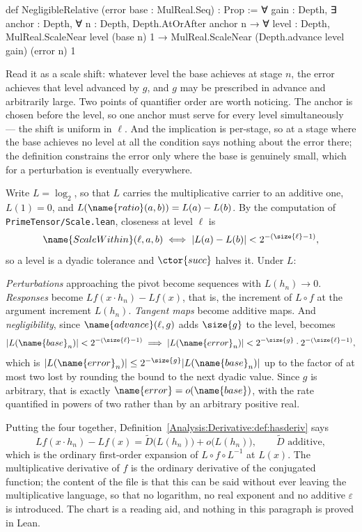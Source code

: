 \begin{leancode}
def NegligibleRelative (error base : MulReal.Seq) : Prop :=
  ∀ gain : Depth,
    ∃ anchor : Depth,
      ∀ n : Depth,
        Depth.AtOrAfter anchor n →
        ∀ level : Depth,
          MulReal.ScaleNear level (base n) 1 →
          MulReal.ScaleNear (Depth.advance level gain) (error n) 1
\end{leancode}

Read it as a scale shift: whatever level the base achieves at stage $n$, the
error achieves that level advanced by $g$, and $g$ may be prescribed in
advance and arbitrarily large.  Two points of quantifier order are worth
noticing.  The anchor is chosen before the level, so one anchor must serve for
every level simultaneously --- the shift is uniform in $\ell$.  And the
implication is per-stage, so at a stage where the base achieves no level at all
the condition says nothing about the error there; the definition constrains the
error only where the base is genuinely small, which for a perturbation is
eventually everywhere.

\begin{designnote}
\label{Analysis:Derivative:note:log}
Write $L = \log_2$, so that $L$ carries the multiplicative carrier to an
additive one, $L(1) = 0$, and $L(\name{ratio}(a,b)) = L(a) - L(b)$.  By the
computation of \texttt{PrimeTensor/Scale.lean}, closeness at level $\ell$ is
\[
  \name{ScaleWithin}(\ell,a,b)
  \iff
  \lvert L(a) - L(b)\rvert < 2^{-(\size{\ell}-1)} ,
\]
so a level is a dyadic tolerance and $\ctor{succ}$ halves it.  Under $L$:

\emph{Perturbations} approaching the pivot become sequences with
$L(h_n) \to 0$.  \emph{Responses} become
$L f(x \cdot h_n) - L f(x)$, that is, the increment of $L \circ f$ at the
argument increment $L(h_n)$.  \emph{Tangent maps} become additive maps.
And \emph{negligibility}, since $\name{advance}(\ell,g)$ adds $\size{g}$ to the
level, becomes
\[
  \lvert L(\name{base}_n)\rvert < 2^{-(\size{\ell}-1)}
  \;\Longrightarrow\;
  \lvert L(\name{error}_n)\rvert < 2^{-\size{g}} \cdot 2^{-(\size{\ell}-1)} ,
\]
which is $\lvert L(\name{error}_n)\rvert \leq 2^{-\size{g}}
\lvert L(\name{base}_n)\rvert$ up to the factor of at most two lost by rounding
the bound to the next dyadic value.  Since $g$ is arbitrary, that is exactly
$\name{error} = o(\name{base})$, with the rate quantified in powers of two
rather than by an arbitrary positive real.

Putting the four together,
Definition~\ref{Analysis:Derivative:def:hasderiv} says
\[
  L f(x \cdot h_n) - L f(x) = \tilde{D}\bigl(L(h_n)\bigr) + o\bigl(L(h_n)\bigr),
  \qquad \tilde{D} \text{ additive},
\]
which is the ordinary first-order expansion of $L \circ f \circ L^{-1}$ at
$L(x)$.  The multiplicative derivative of $f$ is the ordinary derivative of the
conjugated function; the content of the file is that this can be said without
ever leaving the multiplicative language, so that no logarithm, no real
exponent and no additive $\varepsilon$ is introduced.  The chart is a reading
aid, and nothing in this paragraph is proved in Lean.
\end{designnote}

